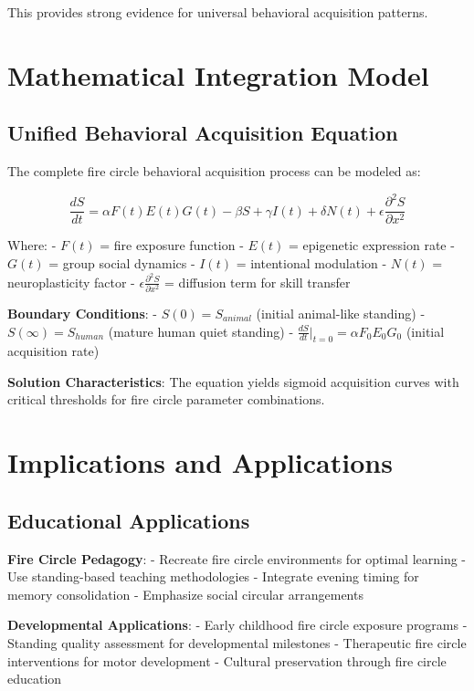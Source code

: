 \documentclass[12pt]{article}
\begin{document}
This provides strong evidence for universal behavioral acquisition patterns.

\section{Mathematical Integration Model}

\subsection{Unified Behavioral Acquisition Equation}

The complete fire circle behavioral acquisition process can be modeled as:

$$\frac{dS}{dt} = \alpha F(t) E(t) G(t) - \beta S + \gamma I(t) + \delta N(t) + \epsilon \frac{\partial^2 S}{\partial x^2}$$

Where:
- $F(t)$ = fire exposure function
- $E(t)$ = epigenetic expression rate
- $G(t)$ = group social dynamics
- $I(t)$ = intentional modulation
- $N(t)$ = neuroplasticity factor
- $\epsilon \frac{\partial^2 S}{\partial x^2}$ = diffusion term for skill transfer

\textbf{Boundary Conditions}:
- $S(0) = S_{animal}$ (initial animal-like standing)
- $S(\infty) = S_{human}$ (mature human quiet standing)
- $\frac{dS}{dt}|_{t=0} = \alpha F_0 E_0 G_0$ (initial acquisition rate)

\textbf{Solution Characteristics}:
The equation yields sigmoid acquisition curves with critical thresholds for fire circle parameter combinations.

\section{Implications and Applications}

\subsection{Educational Applications}

\textbf{Fire Circle Pedagogy}:
- Recreate fire circle environments for optimal learning
- Use standing-based teaching methodologies
- Integrate evening timing for memory consolidation
- Emphasize social circular arrangements

\textbf{Developmental Applications}:
- Early childhood fire circle exposure programs  
- Standing quality assessment for developmental milestones
- Therapeutic fire circle interventions for motor development
- Cultural preservation through fire circle education
\end{document}
